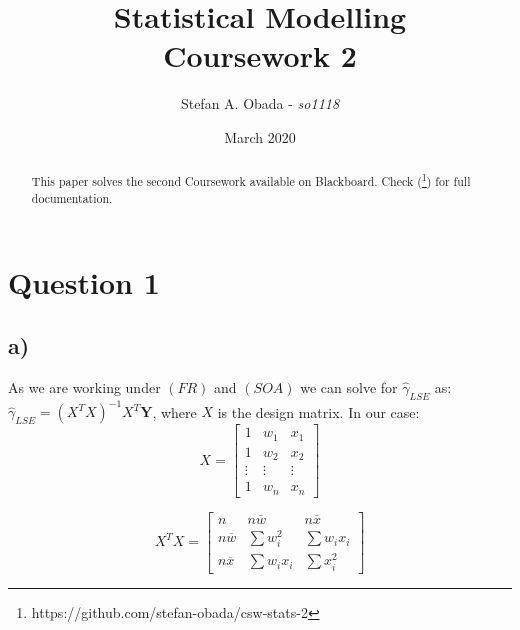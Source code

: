 \documentclass[a4paper]{article}
\title{Statistical Modelling\\
Coursework 2}
\author{Stefan A. Obada - \textit{so1118}}
\date{March 2020}
\begin{document}
\maketitle

\begin{abstract}
	This paper solves the second Coursework available on Blackboard. Check (\footnote{https://github.com/stefan-obada/csw-stats-2}) for full documentation.
\end{abstract}

\tableofcontents



\newpage

\section{Question 1}

\subsection{a)}
As we are working under $(FR)$ and $(SOA)$ we can solve for $\hat{\gamma}_{LSE}$ as: $\hat{\gamma}_{LSE} = (X^{T}X)^{-1}X^{T}\textbf{Y}$, where $X$ is the design matrix. In our case:
\begin{equation*}
X = 
	\begin{bmatrix}
	1 & w_{1} & x_{1} \\
	1 & w_{2} & x_{2} \\
	\vdots  & \vdots  & \vdots \\
	1 & w_{n} & x_{n} 
	\end{bmatrix}
\end{equation*}

\begin{equation*}
X^{T}X = 
	\begin{bmatrix}
	n & n\overline{w} & n\overline{x} \\
	n\overline{w} & \sum{w_{i}^2} & \sum{w_{i}x_{i}} \\
	n\overline{x} & \sum{w_{i}x_{i}} & \sum{x_{i}^2}
	\end{bmatrix}
\end{equation*}
\end{document}
